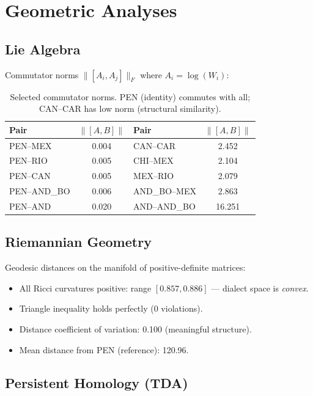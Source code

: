\documentclass[11pt,a4paper]{article}
\begin{document}
\section{Geometric Analyses}

\subsection{Lie Algebra}

Commutator norms $\|[A_i, A_j]\|_F$ where $A_i = \log(W_i)$:

\begin{table}[H]
\centering\small
\begin{tabular}{@{}lc|lc@{}}
\toprule
\textbf{Pair} & $\|[A,B]\|$ & \textbf{Pair} & $\|[A,B]\|$ \\
\midrule
PEN--MEX & 0.004 & CAN--CAR & 2.452 \\
PEN--RIO & 0.005 & CHI--MEX & 2.104 \\
PEN--CAN & 0.005 & MEX--RIO & 2.079 \\
PEN--AND\_BO & 0.006 & AND\_BO--MEX & 2.863 \\
PEN--AND & 0.020 & AND--AND\_BO & 16.251 \\
\bottomrule
\end{tabular}
\caption{Selected commutator norms. PEN (identity) commutes with all; CAN--CAR has low norm (structural similarity).}
\end{table}

\subsection{Riemannian Geometry}

Geodesic distances on the manifold of positive-definite matrices:

\begin{itemize}[nosep]
\item All Ricci curvatures positive: range $[0.857, 0.886]$ --- dialect space is \emph{convex}.
\item Triangle inequality holds perfectly (0 violations).
\item Distance coefficient of variation: 0.100 (meaningful structure).
\item Mean distance from PEN (reference): 120.96.
\end{itemize}

\subsection{Persistent Homology (TDA)}
\end{document}
